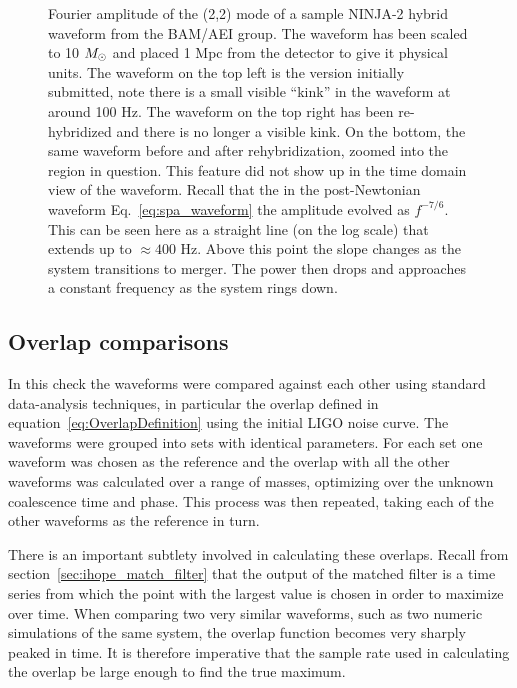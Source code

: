 \begin{figure}
{  \label{f:ninja2_freq_hybrids}
Fourier amplitude of the (2,2) mode of a sample NINJA-2 hybrid
waveform from the BAM/AEI group.  The waveform has been scaled to 10
$M_\odot$ and placed 1 Mpc from the detector to give it physical units.
The waveform on the top left is the version initially submitted, note
there is a small visible ``kink'' in the waveform at around 100 Hz.
The waveform on the top right has been re-hybridized and
there is no longer a visible kink.  On the bottom, the same waveform
before and after rehybridization, zoomed into the region in question.
This feature did not show up in the time domain view of the waveform.
Recall that the in the post-Newtonian waveform Eq.~\ref{eq:spa_waveform}
the amplitude evolved as $f^{-7/6}$.  This can be seen here as a
straight line (on the log scale) that extends up to $\approx
400$ Hz.  Above this point the slope changes as the system transitions
to merger.  The power then drops and approaches a constant frequency
as the system rings down.  
}
\end{figure}%


\subsection{Overlap comparisons}
\label{ssec:ninja2_overlap_comparisons}

In this check the waveforms were compared against each other using
standard data-analysis techniques, in particular the overlap defined
in equation~\ref{eq:OverlapDefinition}  using the initial LIGO noise
curve.  The waveforms were grouped into sets with identical
parameters.  For each set one waveform was chosen as the reference and
the overlap with all the other waveforms was calculated over a range of
masses, optimizing over the unknown coalescence time and phase. 
This process was then repeated, taking each of the other
waveforms as the reference in turn.

There is an important subtlety involved in calculating these overlaps.
Recall from section~\ref{sec:ihope_match_filter} that the output of
the matched filter is a time series from which the point with the
largest value is chosen in order to maximize over time.  When
comparing two very similar waveforms, such as two numeric simulations
of the same system, the overlap function becomes very sharply peaked
in time.  It is therefore imperative that the sample rate used in
calculating the overlap be large enough to find the true maximum.


